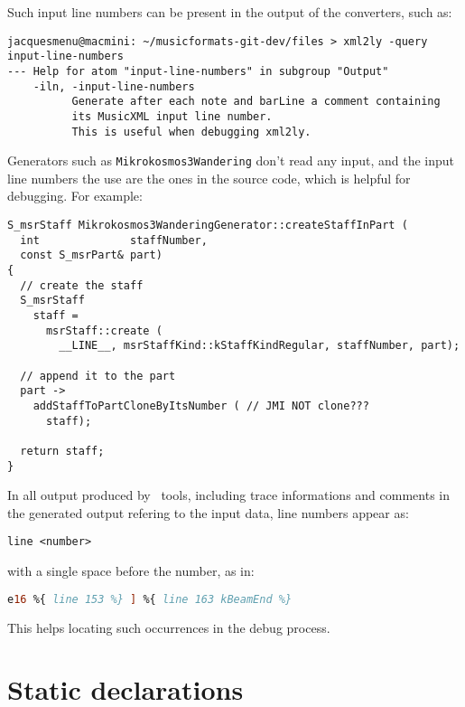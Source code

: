 Such input line numbers can be present in the output of the converters, such as:
\begin{lstlisting}[language=Terminal]
jacquesmenu@macmini: ~/musicformats-git-dev/files > xml2ly -query input-line-numbers
--- Help for atom "input-line-numbers" in subgroup "Output"
    -iln, -input-line-numbers
          Generate after each note and barLine a comment containing
          its MusicXML input line number.
          This is useful when debugging xml2ly.
\end{lstlisting}

Generators such as {\tt Mikrokosmos3Wandering} don't read any input, and the input line numbers the use are the ones in the source code, which is helpful for debugging. For example:
\begin{lstlisting}[language=CPlusPlus]
S_msrStaff Mikrokosmos3WanderingGenerator::createStaffInPart (
  int              staffNumber, 
  const S_msrPart& part)
{
  // create the staff
  S_msrStaff
    staff =
      msrStaff::create (
        __LINE__, msrStaffKind::kStaffKindRegular, staffNumber, part);

  // append it to the part
  part ->
    addStaffToPartCloneByItsNumber ( // JMI NOT clone???
      staff);

  return staff;
}
\end{lstlisting}

In all output produced by \mf\ tools, including trace informations and comments in the generated output refering to the input data, line numbers appear as:
\begin{lstlisting}[language=Terminal]
	line <number>
\end{lstlisting}
with a single space before the number, as in:
\begin{lstlisting}[language=Lilypond]
	e16 %{ line 153 %} ] %{ line 163 kBeamEnd %}
\end{lstlisting}

This helps locating such occurrences in the debug process.


\section{Static declarations}

